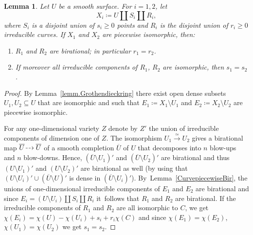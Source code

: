 \documentclass[JEP,XML,SOM,Unicode,NoFloatCountersInSection,published]{cedram}
\newcommand{\dradpl}{{\hspace*{-2.5mm}\begin{tikzcd}[ampersand replacement=\&,column sep = scriptsize]\mbox{}\ar[r,dashed]\&\mbox{}\end{tikzcd}\hspace*{-2.5mm}}}
\newcommand{\dratst}{{\hspace*{-2.5mm}\begin{tikzcd}[ampersand replacement=\&,column sep = small]\mbox{}\ar[r,dashed]\&\mbox{}\end{tikzcd}\hspace*{-2mm}}}
\let\drascst\dratst
\newcommand{\dra}{\mathchoice{\dradpl}{\dratst}{\drascst}{\drascst}}
\newtheorem{lemma}{Lemma}[section]
\theoremstyle{definition}
\newcommand\iso{\stackrel{\simeq}{\longrightarrow}}
\begin{document}
\begin{lemma}
\label{Lem.Example_piecewise_isom}
Let $U$ be a smooth surface.
For $i = 1, 2$, let
\[
X_i \coloneqq U \amalg S_i \amalg R_i,
\]
where $S_i$ is a disjoint union of $s_i \geq 0$ points and $R_i$ is the disjoint union of $r_i \geq 0$ irreducible curves.
If $X_1$ and $X_2$ are piecewise isomorphic, then:
\begin{enumerate}
\item $R_1$ and $R_2$ are birational; in particular $r_1 = r_2$.
\item If moreover all irreducible components of $R_1$, $R_2$ are isomorphic, then $s_1 = s_2$.
\end{enumerate}
\end{lemma}

\begin{proof}
By Lemma~\ref{lemm.Grothendieckring} there exist open dense subsets $U_1, U_2 \subseteq U$
that are isomorphic and such that $E_1 \coloneqq X_1 \setminus U_1$ and $E_2 \coloneqq X_2 \setminus U_2$
are piecewise isomorphic.

For any one-dimensional variety $Z$ denote by $Z'$ the union of
irreducible components
of dimension one of $Z$.
The isomorphism $U_1 \iso U_2$ gives a birational map
$\overline{U} \dra \overline{U}$
of a smooth completion $\overline{U}$ of $U$
that decomposes into $n$ blow-ups and $n$ blow-downs.
Hence, $(\overline{U} \setminus U_1)'$ and $(\overline{U} \setminus U_2)'$
are birational and thus
$(U \setminus U_1)'$ and $(U \setminus U_2)'$ are birational as well
(by using that $(U \setminus U_i)' \cup (\overline{U} \setminus U)'$
is dense in $(\overline{U} \setminus U_i)'$).
By~Lemma~\ref{CurvepiecewiseBir}, the unions of
one-dimensional irreducible components of $E_1$ and $E_2$ are birational
and
since $E_i = (U \setminus U_i) \amalg S_i \amalg R_i$ it~follows that $R_1$ and $R_2$
are bira\-tional. If the irreducible components of $R_1$ and $R_2$ are all isomorphic to $C$, we get
$\chi(E_i) = \chi(U) - \chi(U_i) + s_i + r_i \chi(C)$ and since
$\chi(E_1) = \chi(E_2)$, $\chi(U_1) = \chi(U_2)$ we get $s_1 = s_2$.
\end{proof}
\end{document}
